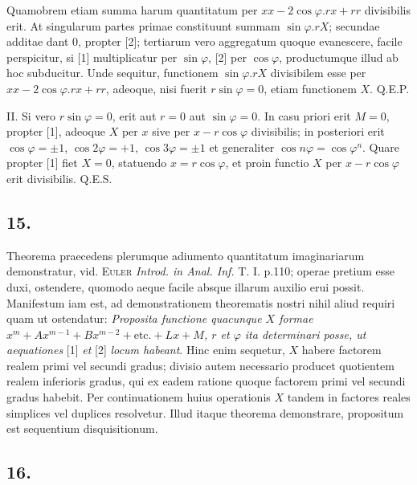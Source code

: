 \documentclass[twoside,12pt, showframe]{memoir}
\begin{document}
Quamobrem etiam summa harum quantitatum per \(xx-2\cos\varphi.rx+rr\) divisibilis erit. At singularum partes primae constituunt summam \(\sin\varphi.rX\); secundae additae dant \(0\), propter [2]; tertiarum vero aggregatum quoque evanescere, facile perspicitur, si [1] multiplicatur per \(\sin \varphi\), [2] per \(\cos \varphi\), productumque illud ab hoc subducitur. Unde sequitur, functionem \(\sin \varphi . r X\) divisibilem esse per \(xx - 2 \cos \varphi .rx +rr\), adeoque, nisi fuerit \(r \sin \varphi = 0\), etiam functionem \(X\).  Q.E.P.

II. Si vero \(r \sin \varphi = 0\), erit aut \(r = 0\) aut \(\sin \varphi = 0\). In casu priori erit \(M=0\), propter [1], adeoque \(X\) per \(x\) sive per \(x - r\cos\varphi\) divisibilis; in posteriori erit \(\cos \varphi = \pm 1\), \(\cos 2 \varphi = +1\), \(\cos 3 \varphi = \pm 1\) et generaliter \(\cos n\varphi = \cos \varphi^n\). Quare propter [1] fiet \(X=0\), statuendo \(x=r \cos \varphi\), et proin functio \(X\) per \(x-r\cos\varphi\) erit divisibilis.   Q.E.S.

\subsection*{15.}

Theorema praecedens plerumque adiumento quantitatum imaginariarum demonstratur, vid. \textsc{Euler} \textit{Introd. in Anal. Inf. }T. I. p.110; operae pretium esse duxi, ostendere, quomodo aeque facile absque illarum auxilio erui possit. Manifestum iam est, ad demonstrationem theorematis nostri nihil aliud requiri quam ut ostendatur: \textit{Proposita functione quacunque \(X\) formae \( x^m + Ax^{m-1}+Bx^{m-2}+\text{etc{.}} +Lx + M\), \(r\)  et \(\varphi\) ita determinari posse, ut aequationes} [1] \textit{et} [2] \textit{locum habeant}. Hinc enim sequetur, \(X\) habere factorem realem primi vel secundi gradus; divisio autem necessario producet quotientem realem inferioris gradus, qui ex eadem ratione quoque factorem primi vel secundi gradus habebit. Per continuationem huius operationis \(X\) tandem in factores reales simplices vel duplices resolvetur. Illud itaque theorema demonstrare, propositum est sequentium disquisitionum.

\subsection*{16.}
\end{document}
